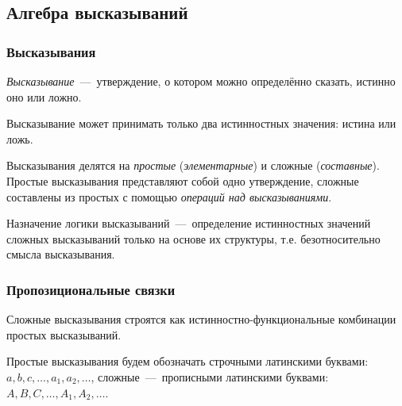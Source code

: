 \subsection{Алгебра высказываний}
\subsubsection{Высказывания}
\textit{Высказывание}~---~утверждение, о котором можно определённо сказать,
истинно оно или ложно.

Высказывание может принимать только два истинностных значения: истина или ложь.

Высказывания делятся на \textit{простые} (\textit{элементарные}) и сложные (\textit{составные}). Простые высказывания представляют собой одно утверждение, сложные составлены из простых с помощью \textit{операций над высказываниями}.

Назначение логики высказываний~---~определение истинностных значений сложных высказываний только на основе их структуры, т.е. безотносительно смысла высказывания.

\subsubsection{Пропозициональные связки}
Сложные высказывания строятся как истинностно-функциональные комбинации простых высказываний.

Простые высказывания будем обозначать строчными латинскими
буквами: $a, b, c, \dots, a_1, a_2, \dots$, сложные~---~прописными латинскими буквами: $A, B, C, \dots, A_1, A_2, \dots$.

